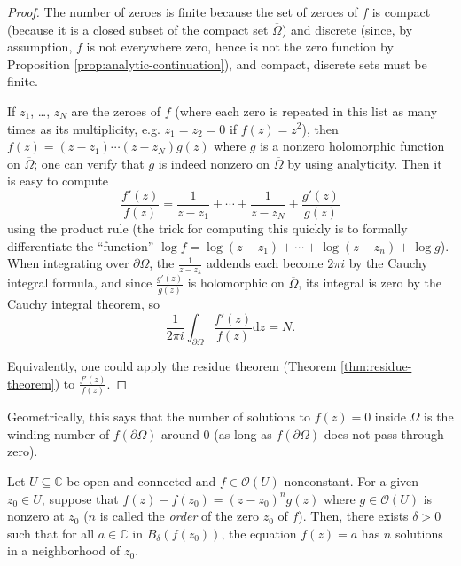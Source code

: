 \documentclass[10pt]{article}
\providecommand{\ol}{\overline}
\providecommand{\dd}{\mathrm d}
\providecommand{\CC}{\mathbb C}
\providecommand{\vocab}[1]{{{\sffamily\textit{#1}}}}
\begin{document}
\begin{proof}
    The number of zeroes is finite because
    the set of zeroes of $f$ is compact (because it is
    a closed subset of the compact set $\ol\Omega$) and discrete
    (since, by assumption, $f$ is not everywhere zero,
    hence is not the zero function by
    Proposition \ref{prop:analytic-continuation}),
    and compact, discrete sets must be finite.

    If $z_1$, \dots, $z_N$ are the zeroes of $f$
    (where each zero is repeated in this list
    as many times as its multiplicity, e.g. $z_1=z_2 = 0$ if $f(z) = z^2$),
    then $f(z) = (z-z_1)\cdots(z-z_N)g(z)$
    where $g$ is a nonzero holomorphic function on $\ol\Omega$;
    one can verify that $g$ is indeed nonzero on $\ol\Omega$
    by using analyticity. Then it is easy to compute
    \begin{equation*}
	\frac{f'(z)}{f(z)} = \frac{1}{z-z_1} + \cdots + \frac 1{z-z_N}
	+ \frac{g'(z)}{g(z)}
    \end{equation*}
    using the product rule (the trick for computing this quickly is
    to formally differentiate the ``function''
    $\log f = \log(z-z_1) + \cdots + \log(z-z_n) + \log g$).
    When integrating over $\partial\Omega$, the $\frac 1{z-z_k}$ addends
    each become $2\pi i$ by the Cauchy integral formula,
    and since $\frac{g'(z)}{g(z)}$ is holomorphic on $\ol\Omega$,
    its integral is zero by the Cauchy integral theorem, so
    \begin{equation*}
	\frac 1{2\pi i}\int_{\partial\Omega}\frac{f'(z)}{f(z)}\dd z = N.
    \end{equation*}

    Equivalently, one could apply the residue theorem
    (Theorem \ref{thm:residue-theorem}) to $\frac{f'(z)}{f(z)}$.
\end{proof}

Geometrically, this says that the number of solutions to $f(z) = 0$
inside $\Omega$ is the winding number of $f(\partial\Omega)$ around $0$
(as long as $f(\partial\Omega)$ does not pass through zero).

\begin{corollary}
    \label{coro:locally-polynomial}
    Let $U\subseteq\CC$ be open and connected
    and $f\in\mathcal O(U)$ nonconstant.
    For a given $z_0\in U$, suppose that $f(z) - f(z_0) = (z-z_0)^ng(z)$
    where $g\in\mathcal O(U)$ is nonzero at $z_0$
    ($n$ is called the \vocab{order} of the zero $z_0$ of $f$).
    Then, there exists $\delta>0$ such that for all $a\in\CC$
    in $B_\delta(f(z_0))$, the equation $f(z) = a$
    has $n$ solutions in a neighborhood of $z_0$.
\end{corollary}
\end{document}
